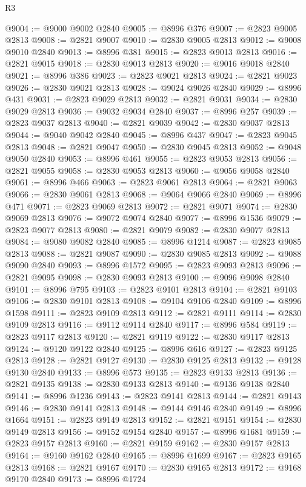 \begin{lexlean}{R3}
\begin{coremodule}
@9004 := @9000 @9002 @2840
@9005 := @8996 @376
@9007 := @2823 @9005 @2813
@9008 := @2821 @9007
@9010 := @2830 @9005 @2813
@9012 := @9008 @9010 @2840
@9013 := @8996 @381
@9015 := @2823 @9013 @2813
@9016 := @2821 @9015
@9018 := @2830 @9013 @2813
@9020 := @9016 @9018 @2840
@9021 := @8996 @386
@9023 := @2823 @9021 @2813
@9024 := @2821 @9023
@9026 := @2830 @9021 @2813
@9028 := @9024 @9026 @2840
@9029 := @8996 @431
@9031 := @2823 @9029 @2813
@9032 := @2821 @9031
@9034 := @2830 @9029 @2813
@9036 := @9032 @9034 @2840
@9037 := @8996 @257
@9039 := @2823 @9037 @2813
@9040 := @2821 @9039
@9042 := @2830 @9037 @2813
@9044 := @9040 @9042 @2840
@9045 := @8996 @437
@9047 := @2823 @9045 @2813
@9048 := @2821 @9047
@9050 := @2830 @9045 @2813
@9052 := @9048 @9050 @2840
@9053 := @8996 @461
@9055 := @2823 @9053 @2813
@9056 := @2821 @9055
@9058 := @2830 @9053 @2813
@9060 := @9056 @9058 @2840
@9061 := @8996 @466
@9063 := @2823 @9061 @2813
@9064 := @2821 @9063
@9066 := @2830 @9061 @2813
@9068 := @9064 @9066 @2840
@9069 := @8996 @471
@9071 := @2823 @9069 @2813
@9072 := @2821 @9071
@9074 := @2830 @9069 @2813
@9076 := @9072 @9074 @2840
@9077 := @8996 @1536
@9079 := @2823 @9077 @2813
@9080 := @2821 @9079
@9082 := @2830 @9077 @2813
@9084 := @9080 @9082 @2840
@9085 := @8996 @1214
@9087 := @2823 @9085 @2813
@9088 := @2821 @9087
@9090 := @2830 @9085 @2813
@9092 := @9088 @9090 @2840
@9093 := @8996 @1572
@9095 := @2823 @9093 @2813
@9096 := @2821 @9095
@9098 := @2830 @9093 @2813
@9100 := @9096 @9098 @2840
@9101 := @8996 @795
@9103 := @2823 @9101 @2813
@9104 := @2821 @9103
@9106 := @2830 @9101 @2813
@9108 := @9104 @9106 @2840
@9109 := @8996 @1598
@9111 := @2823 @9109 @2813
@9112 := @2821 @9111
@9114 := @2830 @9109 @2813
@9116 := @9112 @9114 @2840
@9117 := @8996 @584
@9119 := @2823 @9117 @2813
@9120 := @2821 @9119
@9122 := @2830 @9117 @2813
@9124 := @9120 @9122 @2840
@9125 := @8996 @616
@9127 := @2823 @9125 @2813
@9128 := @2821 @9127
@9130 := @2830 @9125 @2813
@9132 := @9128 @9130 @2840
@9133 := @8996 @573
@9135 := @2823 @9133 @2813
@9136 := @2821 @9135
@9138 := @2830 @9133 @2813
@9140 := @9136 @9138 @2840
@9141 := @8996 @1236
@9143 := @2823 @9141 @2813
@9144 := @2821 @9143
@9146 := @2830 @9141 @2813
@9148 := @9144 @9146 @2840
@9149 := @8996 @1664
@9151 := @2823 @9149 @2813
@9152 := @2821 @9151
@9154 := @2830 @9149 @2813
@9156 := @9152 @9154 @2840
@9157 := @8996 @1681
@9159 := @2823 @9157 @2813
@9160 := @2821 @9159
@9162 := @2830 @9157 @2813
@9164 := @9160 @9162 @2840
@9165 := @8996 @1699
@9167 := @2823 @9165 @2813
@9168 := @2821 @9167
@9170 := @2830 @9165 @2813
@9172 := @9168 @9170 @2840
@9173 := @8996 @1724

\end{coremodule}
\end{lexlean}
